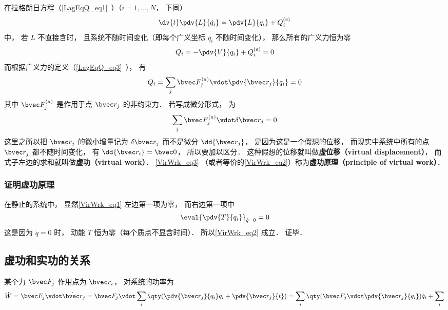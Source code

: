 
\begin{issues}
\issueTODO
\end{issues}


在拉格朗日方程（\autoref{LagEqQ_eq1}~）（$i=1,\dots,N$， 下同）
\begin{equation}\label{VirWrk_eq1}
\dv{t} \pdv{L}{\dot q_i} = \pdv{L}{q_i} + Q_i^{(e)}
\end{equation}
中， 若 $L$ 不直接含时， 且系统不随时间变化（即每个广义坐标 $q_i$ 不随时间变化）， 那么所有的广义力恒为零
\begin{equation}\label{VirWrk_eq2}
Q_i = -\pdv{V}{q_i} + Q_i^{(e)} = 0
\end{equation}
而根据广义力的定义（\autoref{LagEqQ_eq3}~）， 有
\begin{equation}
Q_i = \sum_j \bvec F_j^{(a)} \vdot \pdv{\bvec r_j}{q_i} = 0
\end{equation}
其中 $\bvec F_j^{(a)}$ 是作用于点 $\bvec r_j$ 的非约束力． 若写成微分形式， 为
\begin{equation}\label{VirWrk_eq3}
\sum_j \bvec F_j^{(a)} \vdot \delta \bvec r_j = 0
\end{equation}
这里之所以把 $\bvec r_j$ 的微小增量记为 $\delta \bvec r_j$ 而不是微分 $\dd{\bvec r_j}$， 是因为这是一个假想的位移， 而现实中系统中所有的点 $\bvec r_j$ 都不随时间变化， 有 $\dd{\bvec r_i} = \bvec 0$， 所以要加以区分． 这种假想的位移就叫做\textbf{虚位移（virtual displacement）}， 而式子左边的求和就叫做\textbf{虚功（virtual work）}． \autoref{VirWrk_eq3} （或者等价的\autoref{VirWrk_eq2}）称为\textbf{虚功原理（principle of virtual work）}．

\subsubsection{证明虚功原理}
在静止的系统中， 显然\autoref{VirWrk_eq1} 左边第一项为零， 而右边第一项中
\begin{equation}
\eval{\pdv{T}{q_i}}_{\dot q = 0} = 0
\end{equation}
这是因为 $\dot q = 0$ 时， 动能 $T$ 恒为零（每个质点不显含时间）． 所以\autoref{VirWrk_eq2} 成立． 证毕．


\subsection{虚功和实功的关系}
某个力 $\bvec F_j$ 作用点为 $\bvec r_i$， 对系统的功率为
\begin{equation}
\dot W = \bvec F_j \vdot \dot {\bvec r}_j
= \bvec F_j \vdot \sum_i \qty(\pdv{\bvec r_j}{q_i} \dot q_i + \pdv{\bvec r_j}{t})
= \sum_i \qty(\bvec F_j \vdot \pdv{\bvec r_j}{q_i}) \dot q_i + \sum_i 
\end{equation}
